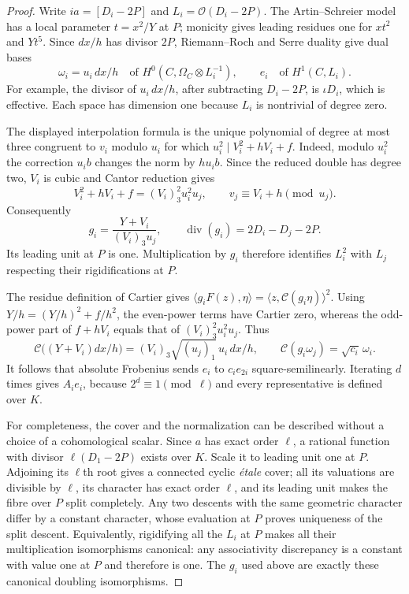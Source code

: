 \begin{proof}
Write $ia=[D_i-2P]$ and $L_i=\mathcal O(D_i-2P)$.
The Artin--Schreier model has a local parameter $t=x^2/Y$ at $P$;
monicity gives leading residues one for $xt^2$ and $Yt^5$.
Since $dx/h$ has divisor $2P$, Riemann--Roch and Serre duality
give dual bases
\[
 \omega_i=u_i\,dx/h\quad\text{of }H^0(C,\Omega_C\otimes L_i^{-1}),
 \qquad e_i\quad\text{of }H^1(C,L_i).
\]
For example, the divisor of $u_i\,dx/h$, after subtracting
$D_i-2P$, is $\iota D_i$, which is effective. Each space has
dimension one because $L_i$ is nontrivial of degree zero.

The displayed interpolation formula is the unique polynomial of
degree at most three congruent to $v_i$ modulo $u_i$ for which
$u_i^2\mid V_i^2+hV_i+f$. Indeed, modulo $u_i^2$ the correction
$u_i b$ changes the norm by $hu_i b$. Since the reduced double
has degree two, $V_i$ is cubic and Cantor reduction gives
\[
 V_i^2+hV_i+f=(V_i)_3^2u_i^2u_j,
 \qquad v_j\equiv V_i+h\pmod {u_j}.
\]
Consequently
\[
 g_i=\frac{Y+V_i}{(V_i)_3u_j},\qquad
 \operatorname{div}(g_i)=2D_i-D_j-2P.
\]
Its leading unit at $P$ is one. Multiplication by $g_i$ therefore
identifies $L_i^2$ with $L_j$ respecting their rigidifications at $P$.

The residue definition of Cartier gives
$\langle g_iF(z),\eta\rangle
 =\langle z,\mathcal C(g_i\eta)\rangle^2$.
Using $Y/h=(Y/h)^2+f/h^2$, the even-power terms have Cartier zero,
whereas the odd-power part of $f+hV_i$ equals that of
$(V_i)_3^2u_i^2u_j$. Thus
\[
 \mathcal C\bigl((Y+V_i)dx/h\bigr)
      =(V_i)_3\sqrt{(u_j)_1}\,u_i\,dx/h,
 \qquad
 \mathcal C(g_i\omega_j)=\sqrt{c_i}\,\omega_i.
\]
It follows that absolute Frobenius sends $e_i$ to $c_i e_{2i}$
square-semilinearly. Iterating $d$ times gives $A_i e_i$, because
$2^d\equiv1\pmod\ell$ and every representative is defined over $K$.

For completeness, the cover and the normalization can be described
without a choice of a cohomological scalar. Since $a$ has exact
order $\ell$, a rational function with divisor $\ell(D_1-2P)$
exists over $K$. Scale it to leading unit one at $P$. Adjoining
its $\ell$th root gives a connected cyclic \emph{\'etale} cover;
all its valuations are divisible by $\ell$, its character has
exact order $\ell$, and its leading unit makes the fibre over
$P$ split completely. Any two descents with the same geometric
character differ by a constant character, whose evaluation at
$P$ proves uniqueness of the split descent. Equivalently,
rigidifying all the $L_i$ at $P$ makes all their multiplication
isomorphisms canonical: any associativity discrepancy is a
constant with value one at $P$ and therefore is one. The $g_i$
used above are exactly these canonical doubling isomorphisms.


\end{proof}

